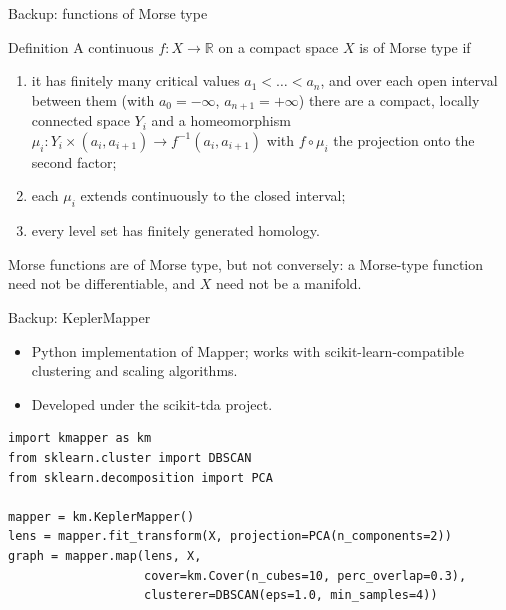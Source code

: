 \documentclass[aspectratio=169]{beamer}
\newcommand{\R}{\mathbb{R}}
\begin{document}
\begin{frame}{Backup: functions of Morse type}
\begin{block}{Definition}
A continuous $f : X \to \R$ on a compact space $X$ is of \alert{Morse type} if
\begin{enumerate}
  \item it has finitely many critical values $a_1 < \dots < a_n$, and over each open interval between them (with $a_0 = -\infty$, $a_{n+1} = +\infty$) there are a compact, locally connected space $Y_i$ and a homeomorphism $\mu_i : Y_i \times (a_i, a_{i+1}) \to f^{-1}(a_i, a_{i+1})$ with $f \circ \mu_i$ the projection onto the second factor;
  \item each $\mu_i$ extends continuously to the closed interval;
  \item every level set has finitely generated homology.
\end{enumerate}
\par\vspace{2pt}\hfill{\scriptsize\textcolor{gray}{\parencite[Def.~1]{carriereoudot2018}}}
\end{block}
Morse functions are of Morse type, but not conversely: a Morse-type function need not be differentiable, and $X$ need not be a manifold. \hfill\parencite{carriereoudot2018}
\end{frame}

\begin{frame}[fragile]{Backup: KeplerMapper}
\begin{itemize}
  \item Python implementation of Mapper; works with scikit-learn-compatible clustering and scaling algorithms. \hfill\parencite{vanveen2019keplermapper,pedregosa2011sklearn}
  \item Developed under the scikit-tda project. \hfill\parencite{keplermapper_repo}
\end{itemize}
\begin{lstlisting}
import kmapper as km
from sklearn.cluster import DBSCAN
from sklearn.decomposition import PCA

mapper = km.KeplerMapper()
lens = mapper.fit_transform(X, projection=PCA(n_components=2))
graph = mapper.map(lens, X,
                   cover=km.Cover(n_cubes=10, perc_overlap=0.3),
                   clusterer=DBSCAN(eps=1.0, min_samples=4))
\end{lstlisting}
\end{frame}
\end{document}
